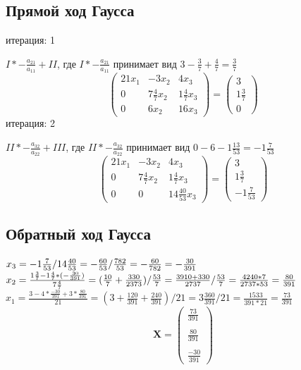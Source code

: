 \documentclass{article}
\begin{document}
\subsection{Прямой ход Гаусса}
итерация: 1 

$I * -\frac{a_{21}}{a_{11}} + II$, где 
$I * -\frac{a_{21}}{a_{11}}$ принимает вид $3 - \frac{3}{7} + \frac{4}{7} =
\frac{3}{7}$
\begin{displaymath}
\left(
  \begin{array}{ccc}
    21 x_{1} & -3 x_{2} & 4 x_{3} \\
    0 & 7 \frac{4}{7} x_{2} & 1 \frac{4}{7} x_{3} \\
    0 & 6 x_{2} & 16 x_{3}
  \end{array}
\right)
=
\left(
  \begin{array}{ccc}
    3\\
    1\frac{3}{7}\\
    0
  \end{array}
\right)
\end{displaymath}
итерация: 2

$II * -\frac{a_{32}}{a_{22}} + III$, где 
$II * -\frac{a_{32}}{a_{22}}$ принимает вид $0 - 6 - 1\frac{13}{53} =
-1\frac{7}{53}$
\begin{displaymath}
\left(
  \begin{array}{ccc}
    21 x_{1} & -3 x_{2} & 4 x_{3} \\
    0 & 7 \frac{4}{7} x_{2} & 1 \frac{4}{7} x_{3} \\
    0 & 0 & 14\frac{40}{53} x_{3}
  \end{array}
\right)
=
\left(
  \begin{array}{ccc}
    3\\
    1\frac{3}{7}\\
    -1\frac{7}{53}
  \end{array}
\right)
\end{displaymath}

\subsection{Обратный ход Гаусса}

$x_{3} = -1\frac{7}{53} / 14\frac{40}{53} = -\frac{60}{53}/\frac{782}{53} 
= -\frac{60}{782} = -\frac{30}{391} \\$
$x_{2} = \frac{1\frac{3}{7} - 1\frac{4}{7} * (-\frac{30}{391})}{7 \frac{4}{7}} 
= (\frac{10}{7} + \frac{330}{2373}) / \frac{53}{7} 
= \frac{3910 + 330}{2737} / \frac{53}{7} 
= \frac{4240 * 7}{2737 * 53} 
= \frac{80}{391}\\$
$x_{1} = \frac{3 - 4*\frac{-30}{391} + 3*\frac{80}{391}}{21}
= (3 + \frac{120}{391} + \frac{240}{391})/21
= 3\frac{360}{391} / 21
= \frac{1533}{391 * 21} 
= \frac{73}{391}$
\begin{displaymath}
\mathbf{X} =
\left( \begin{array}{ccc}
  \frac{73}{391}\\ \\
  \frac{80}{391}\\ \\
  \frac{-30}{391} 
\end{array} \right)
\end{displaymath}
\end{document}
